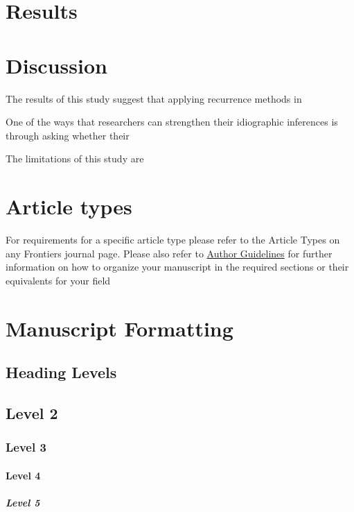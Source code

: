 \documentclass[utf8]{FrontiersinVancouver}
\begin{document}
\section{Results}

\section{Discussion}
The results of this study suggest that applying recurrence methods in 

One of the ways that researchers can strengthen their idiographic inferences is through asking whether their 

The limitations of this study are 
\section{Article types}

For requirements for a specific article type please refer to the Article Types on any Frontiers journal page. Please also refer to  \href{http://home.frontiersin.org/about/author-guidelines#Sections}{Author Guidelines} for further information on how to organize your manuscript in the required sections or their equivalents for your field


\section{Manuscript Formatting}

\subsection{Heading Levels}


\subsection{Level 2}
\subsubsection{Level 3}
\paragraph{Level 4}
\subparagraph{Level 5}
\end{document}

